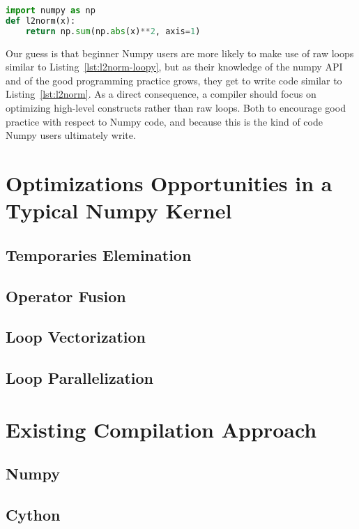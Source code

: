 \documentclass[10pt, preprint]{sigplanconf}
\begin{document}
\begin{lstlisting}[language=python,caption={Per row version of $L^2$ norm without loop in numpy.}, float, label={lst:l2norm}]
import numpy as np
def l2norm(x):
    return np.sum(np.abs(x)**2, axis=1)
\end{lstlisting}

Our guess is that beginner Numpy users are more likely to make use of raw loops
similar to Listing~\ref{lst:l2norm-loopy}, but as their knowledge of the numpy
API and of the good programming practice grows, they get to write code similar
to Listing~\ref{lst:l2norm}. As a direct consequence, a compiler should
focus on optimizing high-level constructs rather than raw loops. Both to encourage good
practice with respect to Numpy code, and because this is the kind of code Numpy
users ultimately write.


\section{Optimizations Opportunities in a Typical Numpy Kernel}

\subsection{Temporaries Elemination}

\subsection{Operator Fusion}

\subsection{Loop Vectorization}

\subsection{Loop Parallelization}

\section{Existing Compilation Approach}

\subsection{Numpy}
\cite{oliphant2007,numpyarray2011}

\subsection{Cython}
\cite{cython2010}
\end{document}
